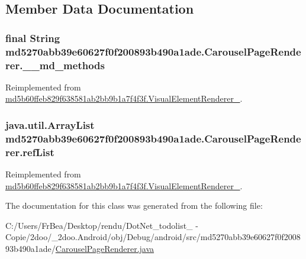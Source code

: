 \subsection{Member Data Documentation}
\hypertarget{classmd5270abb39e60627f0f200893b490a1ade_1_1_carousel_page_renderer_30dd5844560aeae1db3e3ff655ce8f76}{
\subsubsection[{\_\-\_\-md\_\-methods}]{\setlength{\rightskip}{0pt plus 5cm}final String {\bf md5270abb39e60627f0f200893b490a1ade.CarouselPageRenderer.\_\-\_\-md\_\-methods}}}
\label{classmd5270abb39e60627f0f200893b490a1ade_1_1_carousel_page_renderer_30dd5844560aeae1db3e3ff655ce8f76}




Reimplemented from \hyperlink{classmd5b60ffeb829f638581ab2bb9b1a7f4f3f_1_1_visual_element_renderer__1_4ef182bc984a4330ed789e1f0b0222d1}{md5b60ffeb829f638581ab2bb9b1a7f4f3f.VisualElementRenderer\_}.\hypertarget{classmd5270abb39e60627f0f200893b490a1ade_1_1_carousel_page_renderer_d48d9d828a4c63961f1670b716f7dacb}{
\subsubsection[{refList}]{\setlength{\rightskip}{0pt plus 5cm}java.util.ArrayList {\bf md5270abb39e60627f0f200893b490a1ade.CarouselPageRenderer.refList}}}
\label{classmd5270abb39e60627f0f200893b490a1ade_1_1_carousel_page_renderer_d48d9d828a4c63961f1670b716f7dacb}




Reimplemented from \hyperlink{classmd5b60ffeb829f638581ab2bb9b1a7f4f3f_1_1_visual_element_renderer__1_4ebd0e42ebd360712eb189930036fc9f}{md5b60ffeb829f638581ab2bb9b1a7f4f3f.VisualElementRenderer\_}.

The documentation for this class was generated from the following file:\begin{CompactItemize}
\item 
C:/Users/FrBea/Desktop/rendu/DotNet\_\-todolist\_ - Copie/2doo/\_\-2doo.Android/obj/Debug/android/src/md5270abb39e60627f0f200893b490a1ade/\hyperlink{md5270abb39e60627f0f200893b490a1ade_2_carousel_page_renderer_8java}{CarouselPageRenderer.java}\end{CompactItemize}
